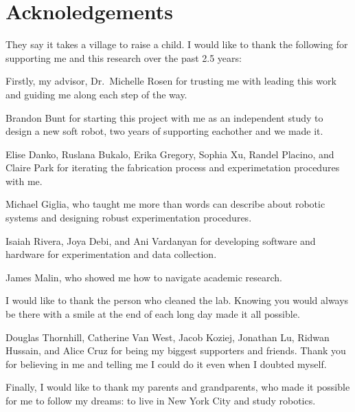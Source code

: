 \section*{Acknoledgements}

They say it takes a village to raise a child. I would like to thank the following for supporting me and this research over the past 2.5 years:

Firstly, my advisor, Dr.~Michelle Rosen for trusting me with leading this work and guiding me along each step of the way.

Brandon Bunt for starting this project with me as an independent study to design a new soft robot, two years of supporting eachother and we made it.

Elise Danko, Ruslana Bukalo, Erika Gregory, Sophia Xu, Randel Placino, and Claire Park for iterating the fabrication process and experimetation procedures with me.

Michael Giglia, who taught me more than words can describe about robotic systems and designing robust experimentation procedures.  

Isaiah Rivera, Joya Debi, and Ani Vardanyan for developing software and hardware for experimentation and data collection.

James Malin, who showed me how to navigate academic research. 

I would like to thank the person who cleaned the lab. Knowing you would always be there with a smile at the end of each long day made it all possible. 

Douglas Thornhill, Catherine Van West, Jacob Koziej, Jonathan Lu, Ridwan Hussain, and Alice Cruz for being my biggest supporters and friends. Thank you for believing in me and telling me I could do it even when I doubted myself.

Finally, I would like to thank my parents and grandparents, who made it possible for me to follow my dreams: to live in New York City and study robotics. 